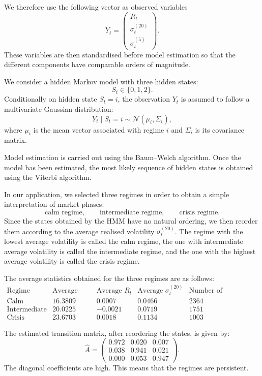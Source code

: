 \documentclass[11pt]{article}
\begin{document}
We therefore use the following vector as observed variables
\[
    Y_t =
    \begin{pmatrix}
        R_t \\
        \sigma^{(20)}_t \\
        \sigma^{(5)}_t
    \end{pmatrix}.
\]
These variables are then standardised before model estimation so that the different components have comparable orders of magnitude.

We consider a hidden Markov model with three hidden states:
\[
    S_t \in \{0,1,2\}.
\]
Conditionally on hidden state $S_t=i$, the observation $Y_t$ is assumed to follow a multivariate Gaussian distribution:
\[
    Y_t \mid S_t=i \sim \mathcal{N}(\mu_i,\Sigma_i),
\]
where $\mu_i$ is the mean vector associated with regime $i$ and $\Sigma_i$ is its covariance matrix. 

Model estimation is carried out using the Baum--Welch algorithm. Once the model has been estimated, the most likely sequence of hidden states is obtained using the Viterbi algorithm.

In our application, we selected three regimes in order to obtain a simple interpretation of market phases:
\[
    \text{calm regime}, \qquad
    \text{intermediate regime}, \qquad
    \text{crisis regime}.
\]
Since the states obtained by the HMM have no natural ordering, we then reorder them according to the average realised volatility $\sigma^{(20)}_t$. The regime with the lowest average volatility is called the calm regime, the one with intermediate average volatility is called the intermediate regime, and the one with the highest average volatility is called the crisis regime.
\vspace{0.5cm}

The average statistics obtained for the three regimes are as follows:
\[
\begin{array}{c|cccc}
\text{Regime} & \text{Average VIX} & \text{Average } R_t & \text{Average } \sigma^{(20)}_t & \text{Number of observations} \\
\hline
\text{Calm} & 16.3809 & 0.0007 & 0.0466 & 2364 \\
\text{Intermediate} & 20.0225 & -0.0021 & 0.0719 & 1751 \\
\text{Crisis} & 23.6703 & 0.0018 & 0.1134 & 1003
\end{array}
\]

\vspace{0.5cm}
The estimated transition matrix, after reordering the states, is given by:
\[
    \widehat{A}
    =
    \begin{pmatrix}
        0.972 & 0.020 & 0.007 \\
        0.038 & 0.941 & 0.021 \\
        0.000 & 0.053 & 0.947
    \end{pmatrix}.
\]
The diagonal coefficients are high. This means that the regimes are persistent.
\end{document}
